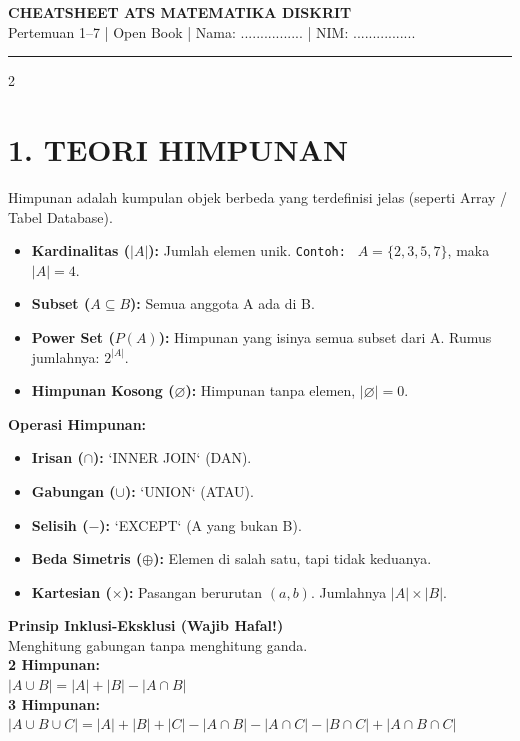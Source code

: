 \documentclass[9pt,a4paper]{extarticle}
\begin{document}
\begin{center}
	\textbf{\Large CHEATSHEET ATS MATEMATIKA DISKRIT} \\
	\vspace{2pt}
	\small Pertemuan 1--7 | Open Book | Nama: ................ | NIM: ................
\end{center}
\vspace{-4mm}
\noindent\rule{\linewidth}{1pt}
\vspace{2mm}

\begin{multicols}{2}

\section*{1. TEORI HIMPUNAN}
Himpunan adalah kumpulan objek berbeda yang terdefinisi jelas (seperti Array / Tabel Database).
\begin{itemize}
    \item \textbf{Kardinalitas (\(|A|\)):} Jumlah elemen unik. \texttt{Contoh: } $A=\{2,3,5,7\}$, maka $|A|=4$.
    \item \textbf{Subset (\(A \subseteq B\)):} Semua anggota A ada di B.
    \item \textbf{Power Set (\(P(A)\)):} Himpunan yang isinya semua subset dari A. Rumus jumlahnya: \(2^{|A|}\).
    \item \textbf{Himpunan Kosong (\(\varnothing\)):} Himpunan tanpa elemen, \(|\varnothing|=0\).
\end{itemize}

\textbf{Operasi Himpunan:}
\begin{itemize}
    \item \textbf{Irisan (\(\cap\)):} `INNER JOIN` (DAN).
    \item \textbf{Gabungan (\(\cup\)):} `UNION` (ATAU).
    \item \textbf{Selisih (\(-\)):} `EXCEPT` (A yang bukan B).
    \item \textbf{Beda Simetris (\(\oplus\)):} Elemen di salah satu, tapi tidak keduanya.
    \item \textbf{Kartesian (\(\times\)):} Pasangan berurutan \((a,b)\). Jumlahnya $|A| \times |B|$.
\end{itemize}

\begin{rumusbox}
\textbf{\textcolor{blue!70!black}{Prinsip Inklusi-Eksklusi (Wajib Hafal!)}} \\
Menghitung gabungan tanpa menghitung ganda. \\
\textbf{2 Himpunan:} \\
\(|A \cup B| = |A| + |B| - |A \cap B|\) \\
\textbf{3 Himpunan:} \\
\(|A \cup B \cup C| = |A|+|B|+|C| - |A \cap B| - |A \cap C| - |B \cap C| + |A \cap B \cap C|\)
\end{rumusbox}


\end{multicols}
\end{document}
